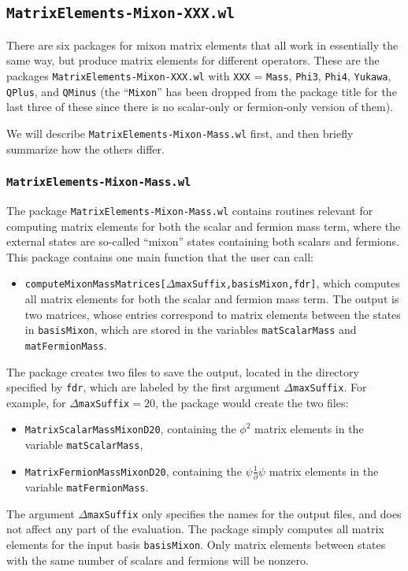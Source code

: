 \documentclass[12pt]{article}
\newcommand\De\Delta
\newcommand{\p}{\partial}
\newcommand{\fr}{\frac}
\begin{document}
\subsection{{\tt MatrixElements-Mixon-XXX.wl}}

There are six packages for mixon matrix elements that all work in essentially the same way, but produce matrix elements for different operators.  These are the packages {\tt MatrixElements-Mixon-XXX.wl} with {\tt XXX} = {\tt Mass}, {\tt Phi3}, {\tt Phi4}, {\tt Yukawa}, {\tt QPlus}, and {\tt QMinus} (the ``{\tt Mixon}'' has been dropped from the package title for the last three of these since there is no scalar-only or fermion-only version of them).

We will describe {\tt MatrixElements-Mixon-Mass.wl} first, and then briefly summarize how the others differ.


\subsubsection*{{\tt MatrixElements-Mixon-Mass.wl}}

The package {\tt MatrixElements-Mixon-Mass.wl} contains routines relevant for computing matrix elements for both the scalar and fermion mass term, where the external states are so-called ``mixon'' states containing both scalars and fermions. This package contains one main function that the user can call:
\begin{itemize}
\item {\tt computeMixonMassMatrices[$\De$maxSuffix,basisMixon,fdr]}, which computes all matrix elements for both the scalar and fermion mass term. The output is two matrices, whose entries correspond to matrix elements between the states in {\tt basisMixon}, which are stored in the variables {\tt matScalarMass} and {\tt matFermionMass}.
\end{itemize}
The package creates two files to save the output, located in the directory specified by {\tt fdr}, which are labeled by the first argument {\tt $\De$maxSuffix}. For example, for {\tt $\De$maxSuffix$=20$}, the package would create the two files:
\begin{itemize}
\item {\tt MatrixScalarMassMixonD20}, containing the $\phi^2$ matrix elements in the variable {\tt matScalarMass},
\item {\tt MatrixFermionMassMixonD20}, containing the $\psi\fr{1}{\p}\psi$ matrix elements in the variable {\tt matFermionMass}.
\end{itemize}
The argument {\tt $\De$maxSuffix} only specifies the names for the output files, and does not affect any part of the evaluation. The package simply computes all matrix elements for the input basis {\tt basisMixon}. Only matrix elements between states with the same number of scalars and fermions will be nonzero.
\end{document}
